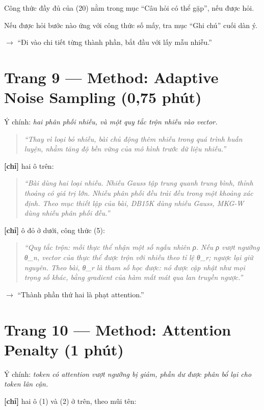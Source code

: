 \documentclass[11pt,a4paper]{article}
\begin{document}
Công thức đầy đủ của (20) nằm trong mục ``Câu hỏi có thể gặp'', nếu được hỏi.


Nếu được hỏi bước nào ứng với công thức số mấy, tra mục ``Ghi chú'' cuối dàn ý.


\textbf{$\to$} ``Đi vào chi tiết từng thành phần, bắt đầu với lấy mẫu nhiễu.''


\section*{Trang 9 --- Method: Adaptive Noise Sampling (0,75 phút)}

Ý chính: \emph{hai phân phối nhiễu, và một quy tắc trộn nhiễu vào vector.}


\begin{quote}\itshape ``Thay vì loại bỏ nhiễu, bài \emph{chủ động thêm nhiễu} trong quá trình huấn luyện, nhằm tăng độ bền vững của mô hình trước dữ liệu nhiễu.''\end{quote}

\textbf{[chỉ]} hai ô trên:


\begin{quote}\itshape ``Bài dùng hai loại nhiễu. Nhiễu Gauss tập trung quanh trung bình, thỉnh thoảng có giá trị lớn. Nhiễu phân phối đều trải đều trong một khoảng xác định. Theo mục thiết lập của bài, DB15K dùng nhiễu Gauss, MKG-W dùng nhiễu phân phối đều.''\end{quote}

\textbf{[chỉ]} ô đỏ ở dưới, công thức (5):


\begin{quote}\itshape ``Quy tắc trộn: mỗi thực thể nhận một số ngẫu nhiên ρ. Nếu ρ vượt ngưỡng θ\_n, vector của thực thể được trộn với nhiễu theo tỉ lệ θ\_r; ngược lại giữ nguyên. Theo bài, θ\_r là tham số \emph{học được}: nó được cập nhật như mọi trọng số khác, bằng gradient của hàm mất mát qua lan truyền ngược.''\end{quote}

\textbf{$\to$} ``Thành phần thứ hai là phạt attention.''


\section*{Trang 10 --- Method: Attention Penalty (1 phút)}

Ý chính: \emph{token có attention vượt ngưỡng bị giảm, phần dư được phân bổ lại cho token lân cận.}


\textbf{[chỉ]} hai ô (1) và (2) ở trên, theo mũi tên:
\end{document}
